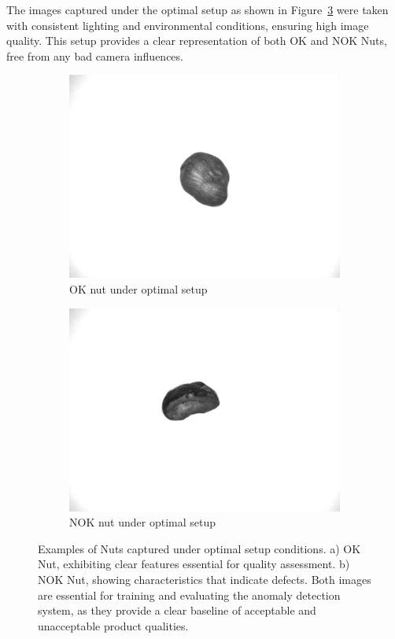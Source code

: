 \documentclass[12pt,DIV14,BCOR12mm,a4paper,footinclude=false,headinclude,parskip=half-,twoside,openright,cleardoublepage=empty,toc=index,bibliography=totoc,listof=totoc]{scrreprt}
\numberwithin{equation}{chapter}
\begin{document}
The images captured under the optimal setup as shown in Figure~\ref{fig:optimal_setup} were taken with consistent lighting and environmental conditions, ensuring high image quality. This setup provides a clear representation of both OK and NOK Nuts, free from any bad camera influences.
\begin{figure}
    \centering
    \begin{subfigure}[b]{0.45\textwidth}
        \centering
        \includegraphics[scale=0.15]{../media/Nuts-Optimal-OK.png}
        \caption{OK nut under optimal setup}
        \label{fig:nut_ok}
    \end{subfigure}
    \hfill
    \begin{subfigure}[b]{0.45\textwidth}
        \centering
        \includegraphics[scale=0.15]{../media/Nuts-optimal-NOK.png}
        \caption{NOK nut under optimal setup}
        \label{fig:nut_nok}
    \end{subfigure}
    \caption{Examples of Nuts captured under optimal setup conditions. a) OK Nut, exhibiting clear features essential for quality assessment. b) NOK Nut, showing characteristics that indicate defects. Both images are essential for training and evaluating the anomaly detection system, as they provide a clear baseline of acceptable and unacceptable product qualities.}
    \label{fig:optimal_setup}
\end{figure}
\end{document}
